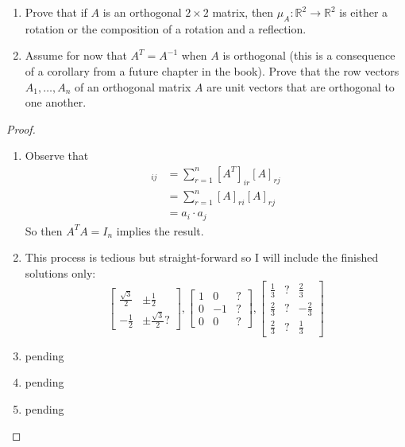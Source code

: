 \begin{exercise}
\begin{enumerate}
        \item Prove that if \( A \) is an orthogonal \( 2 \times 2 \) matrix, then \( \mu_A: \mathbb{R}^2 \rightarrow \mathbb{R}^2 \) is either a rotation or the composition of a rotation and a reflection.
        
        \item Assume for now that \( A^T = A^{-1} \) when \( A \) is orthogonal (this is a consequence of a corollary from a future chapter in the book). Prove that the row vectors \( A_1, \ldots, A_n \) of an orthogonal matrix \( A \) are unit vectors that are orthogonal to one another.
    \end{enumerate}
    
    \begin{proof}
        \begin{enumerate}
            \item Observe that
            \begin{align*}
                [A^TA]_{ij} &= \sum_{r=1}^n [A^T]_{ir} [A]_{rj} \\
                &= \sum_{r=1}^n [A]_{ri} [A]_{rj} \\
                &= a_i \cdot a_j
            \end{align*}
            So then \( A^TA = I_n \) implies the result.
            \item This process is tedious but straight-forward so I will include the finished solutions only:
            \[
                \begin{bmatrix}
                    \frac{\sqrt{3}}{2} & \pm \frac{1}{2} \\ 
                    -\frac{1}{2} & \pm \frac{\sqrt{3}}{2}? 
                \end{bmatrix},
                \begin{bmatrix}
                    1 & 0 & ? \\ 
                    0 & -1 & ? \\ 
                    0 & 0 & ?
                \end{bmatrix},
                \begin{bmatrix}
                    \frac{1}{3} & ? & \frac{2}{3} \\
                    \frac{2}{3} & ? & -\frac{2}{3} \\
                    \frac{2}{3} & ? & \frac{1}{3}
                \end{bmatrix}
            \]
            
            \item pending
            
            \item pending
            
            \item pending
        \end{enumerate}
    \end{proof}
\end{exercise} %

